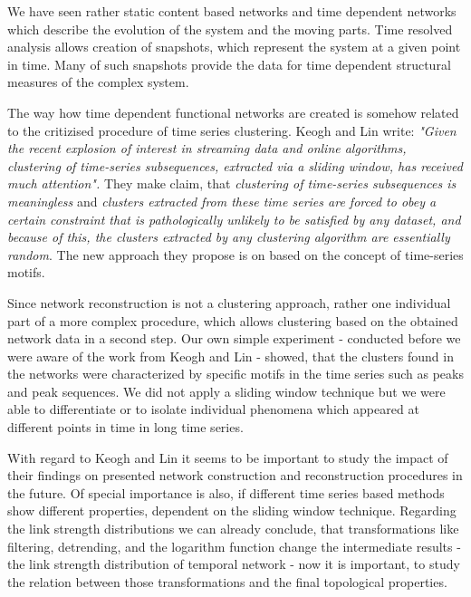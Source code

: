 \documentclass[a4paper,10pt]{scrbook}
\begin{document}
We have seen rather static content based networks and time dependent networks which describe the evolution of the system and the moving parts. Time resolved analysis allows creation of snapshots, which represent the system at a given point in time. Many of such snapshots provide the data for time dependent structural measures of the complex system.

 
The way how time dependent functional networks are created is somehow related to the critizised procedure of time series clustering. Keogh and Lin \cite{Keogh2005} write: 
\textit{"Given the recent explosion of interest in streaming data and online algorithms, clustering of time-series subsequences, extracted via a sliding window, has received much attention".}
They make claim, that \textit{clustering of time-series subsequences is meaningless} and \textit{clusters extracted from these time series are forced to obey a certain constraint that is pathologically unlikely to be satisfied by any dataset, and because of this, the clusters extracted by any clustering algorithm are essentially random}. The new approach they propose is on based on the concept of time-series motifs.

Since network reconstruction is not a clustering approach, rather one individual part of a more complex procedure, which allows clustering based on the obtained network data in a second step. Our own simple experiment - conducted before we were aware of the work from Keogh and Lin - showed, that the clusters found in the networks were characterized by specific motifs in the time series such as peaks and peak sequences. We did not apply a sliding window technique but we were able to differentiate or to isolate individual phenomena which appeared at different points in time in long time series. 

With regard to Keogh and Lin it seems to be important to study the impact of their findings on presented network construction and reconstruction procedures in the future. Of special importance is also, if different time series based methods show different properties, dependent on the sliding window technique. Regarding the link strength distributions we can already conclude, that transformations like filtering, detrending, and the logarithm function change the intermediate results - the link strength distribution of temporal network - now it is important, to study the relation between those transformations and the final topological properties. 
 
\end{document}
